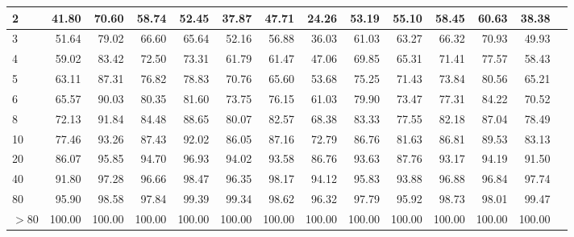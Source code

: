\begin{tabular}{|l|r|r|r|r|r|r|r|r|r|r|r|r|r|}
2 & 41.80 & 70.60 & 58.74 & 52.45 & 37.87 & 47.71 & 24.26 & 53.19 & 55.10 & 58.45 & 60.63 & 38.38\\\hline
3 & 51.64 & 79.02 & 66.60 & 65.64 & 52.16 & 56.88 & 36.03 & 61.03 & 63.27 & 66.32 & 70.93 & 49.93\\\hline
4 & 59.02 & 83.42 & 72.50 & 73.31 & 61.79 & 61.47 & 47.06 & 69.85 & 65.31 & 71.41 & 77.57 & 58.43\\\hline
5 & 63.11 & 87.31 & 76.82 & 78.83 & 70.76 & 65.60 & 53.68 & 75.25 & 71.43 & 73.84 & 80.56 & 65.21\\\hline
6 & 65.57 & 90.03 & 80.35 & 81.60 & 73.75 & 76.15 & 61.03 & 79.90 & 73.47 & 77.31 & 84.22 & 70.52\\\hline
8 & 72.13 & 91.84 & 84.48 & 88.65 & 80.07 & 82.57 & 68.38 & 83.33 & 77.55 & 82.18 & 87.04 & 78.49\\\hline
10 & 77.46 & 93.26 & 87.43 & 92.02 & 86.05 & 87.16 & 72.79 & 86.76 & 81.63 & 86.81 & 89.53 & 83.13\\\hline
20 & 86.07 & 95.85 & 94.70 & 96.93 & 94.02 & 93.58 & 86.76 & 93.63 & 87.76 & 93.17 & 94.19 & 91.50\\\hline
40 & 91.80 & 97.28 & 96.66 & 98.47 & 96.35 & 98.17 & 94.12 & 95.83 & 93.88 & 96.88 & 96.84 & 97.74\\\hline
80 & 95.90 & 98.58 & 97.84 & 99.39 & 99.34 & 98.62 & 96.32 & 97.79 & 95.92 & 98.73 & 98.01 & 99.47\\\hline
$>$80 & 100.00 & 100.00 & 100.00 & 100.00 & 100.00 & 100.00 & 100.00 & 100.00 & 100.00 & 100.00 & 100.00 & 100.00\\\hline
\end{tabular}
